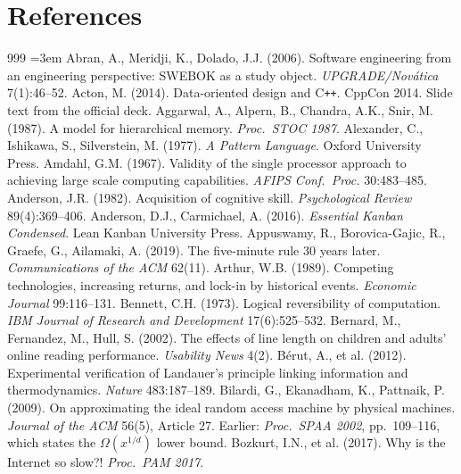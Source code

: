 \documentclass[11pt,oneside]{article}
\theoremstyle{definition}
\theoremstyle{remark}
\begin{document}
\section*{References}
\footnotesize
\begin{thebibliography}{999}
\sloppy
\emergencystretch=3em
\setlength{\itemsep}{1.5pt}
 Abran, A., Meridji, K., Dolado, J.J. (2006). Software engineering from an engineering perspective: SWEBOK as a study object. \emph{UPGRADE/Nov\'atica} 7(1):46--52.
 Acton, M. (2014). Data-oriented design and C\texttt{++}. CppCon 2014. Slide text from the official deck.
 Aggarwal, A., Alpern, B., Chandra, A.K., Snir, M. (1987). A model for hierarchical memory. \emph{Proc.\ STOC 1987}.
 Alexander, C., Ishikawa, S., Silverstein, M. (1977). \emph{A Pattern Language}. Oxford University Press.
 Amdahl, G.M. (1967). Validity of the single processor approach to achieving large scale computing capabilities. \emph{AFIPS Conf.\ Proc.} 30:483--485.
 Anderson, J.R. (1982). Acquisition of cognitive skill. \emph{Psychological Review} 89(4):369--406.
 Anderson, D.J., Carmichael, A. (2016). \emph{Essential Kanban Condensed}. Lean Kanban University Press.
 Appuswamy, R., Borovica-Gajic, R., Graefe, G., Ailamaki, A. (2019). The five-minute rule 30 years later. \emph{Communications of the ACM} 62(11).
 Arthur, W.B. (1989). Competing technologies, increasing returns, and lock-in by historical events. \emph{Economic Journal} 99:116--131.
 Bennett, C.H. (1973). Logical reversibility of computation. \emph{IBM Journal of Research and Development} 17(6):525--532.
 Bernard, M., Fernandez, M., Hull, S. (2002). The effects of line length on children and adults' online reading performance. \emph{Usability News} 4(2).
 B\'erut, A., et al. (2012). Experimental verification of Landauer's principle linking information and thermodynamics. \emph{Nature} 483:187--189.
 Bilardi, G., Ekanadham, K., Pattnaik, P. (2009). On approximating the ideal random access machine by physical machines. \emph{Journal of the ACM} 56(5), Article 27. Earlier: \emph{Proc.\ SPAA 2002}, pp.~109--116, which states the $\Omega(x^{1/d})$ lower bound.
 Bozkurt, I.N., et al. (2017). Why is the Internet so slow?! \emph{Proc.\ PAM 2017}.

\end{thebibliography}
\end{document}
